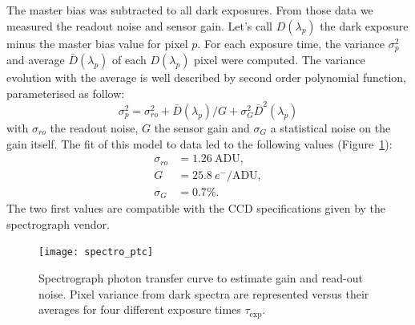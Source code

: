 The master bias was subtracted to all dark exposures. From those data we measured the readout noise and sensor gain. Let's call $D(\lambda_p)$ the dark exposure minus the master bias value for pixel $p$. For each exposure time, the variance $\sigma_p^2$ and average $\bar{D}(\lambda_p)$ of each $D(\lambda_p)$ pixel were computed. The variance evolution with the average is well described by second order polynomial function, parameterised as follow:
\begin{equation}\label{eq:spectro_error_model}
\sigma^2_p =\sigma_{ro}^2 +  \bar{D}(\lambda_p)/G + \sigma_G^2 \bar{D}^2(\lambda_p)
\end{equation}
with $\sigma_{ro}$ the readout noise, $G$ the sensor gain and $\sigma_G$ a statistical noise on the gain itself. The fit of this model to data led to the following values (Figure~\ref{fig:spectro_ptc}):
\begin{align}
    \sigma_{ro} &= 1.26\ \mathrm{ADU}, \\
    G & = 25.8\ e^-/\mathrm{ADU} ,\\
    \sigma_G & = 0.7\%.
\end{align}
The two first values are compatible with the CCD specifications given by the spectrograph vendor. 

\begin{figure}[!h]
\centering
\texttt{[image: spectro\_ptc]}
\caption{Spectrograph photon transfer curve to estimate gain and read-out noise. Pixel variance from dark spectra  are represented versus their averages for four different exposure times $\tau_{\mathrm{exp}}$.}\label{fig:spectro_ptc}
\end{figure}


